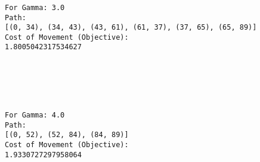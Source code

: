 \documentclass[11pt]{article}
\begin{document}
    \begin{center}
    \end{center}
    { \hspace*{\fill} \\}
    
    \begin{center}
    \end{center}
    { \hspace*{\fill} \\}
    
    \begin{Verbatim}[commandchars=\\\{\}]

For Gamma: 3.0
Path:
[(0, 34), (34, 43), (43, 61), (61, 37), (37, 65), (65, 89)]
Cost of Movement (Objective):
1.8005042317534627

    \end{Verbatim}

    \begin{center}
    \end{center}
    { \hspace*{\fill} \\}
    
    \begin{center}
    \end{center}
    { \hspace*{\fill} \\}
    
    \begin{Verbatim}[commandchars=\\\{\}]

For Gamma: 4.0
Path:
[(0, 52), (52, 84), (84, 89)]
Cost of Movement (Objective):
1.9330727297958064

    \end{Verbatim}

    \begin{center}
    \end{center}
    { \hspace*{\fill} \\}
    
    \begin{center}
    \end{center}
    { \hspace*{\fill} \\}
    

    
    
    
    
\end{document}
